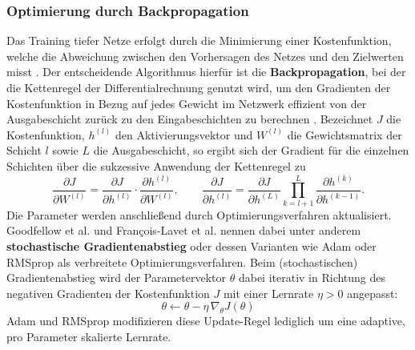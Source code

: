 \subsubsection{Optimierung durch Backpropagation}
Das Training tiefer Netze erfolgt durch die Minimierung einer Kostenfunktion, welche die Abweichung zwischen den Vorhersagen des Netzes und den Zielwerten misst \cite{Goodfellow-et-al-2016, francois-lavetIntroductionDeepReinforcement2018}. Der entscheidende Algorithmus hierfür ist die \textbf{Backpropagation}, bei der die Kettenregel der Differentialrechnung genutzt wird, um den Gradienten der Kostenfunktion in Bezug auf jedes Gewicht im Netzwerk effizient von der Ausgabeschicht zurück zu den Eingabeschichten zu berechnen \cite{Goodfellow-et-al-2016, francois-lavetIntroductionDeepReinforcement2018}. Bezeichnet $J$ die Kostenfunktion, $h^{(l)}$ den Aktivierungsvektor und $W^{(l)}$ die Gewichtsmatrix der Schicht $l$ sowie $L$ die Ausgabeschicht, so ergibt sich der Gradient für die einzelnen Schichten über die sukzessive Anwendung der Kettenregel \cite{Goodfellow-et-al-2016, francois-lavetIntroductionDeepReinforcement2018} zu
\begin{equation}\label{eq:backprop}
\frac{\partial J}{\partial W^{(l)}} = \frac{\partial J}{\partial h^{(l)}} \cdot \frac{\partial h^{(l)}}{\partial W^{(l)}}, \qquad
\frac{\partial J}{\partial h^{(l)}} = \frac{\partial J}{\partial h^{(L)}} \prod_{k=l+1}^{L} \frac{\partial h^{(k)}}{\partial h^{(k-1)}} .
\end{equation}
\newline
Die Parameter werden anschließend durch Optimierungsverfahren aktualisiert. Goodfellow et al. \cite{Goodfellow-et-al-2016} und François-Lavet et al. \cite{francois-lavetIntroductionDeepReinforcement2018} nennen dabei unter anderem \textbf{stochastische Gradientenabstieg} oder dessen Varianten wie Adam oder RMSprop als verbreitete Optimierungsverfahren. Beim (stochastischen) Gradientenabstieg \cite{Goodfellow-et-al-2016, francois-lavetIntroductionDeepReinforcement2018} wird der Parametervektor $\theta$ dabei iterativ in Richtung des negativen Gradienten der Kostenfunktion $J$ mit einer Lernrate $\eta > 0$ angepasst:
\begin{equation}\label{eq:grad_descent}
\theta \leftarrow \theta - \eta\,\nabla_\theta J(\theta)
\end{equation}
Adam und RMSprop modifizieren diese Update-Regel lediglich um eine adaptive, pro Parameter skalierte Lernrate.
